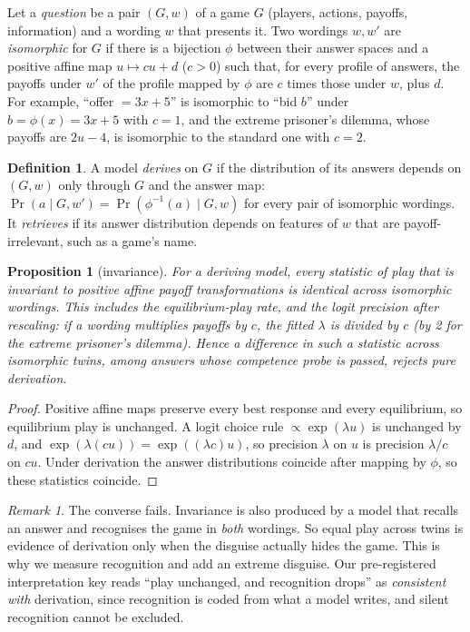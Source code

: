 \documentclass[11pt]{article}
\newtheorem{proposition}{Proposition}
\theoremstyle{definition}
\newtheorem{definition}{Definition}
\theoremstyle{remark}
\newtheorem*{remark}{Remark}
\newcommand{\lam}{\lambda}
\begin{document}
Let a \emph{question} be a pair $(G, w)$ of a game $G$ (players, actions, payoffs, information)
and a wording $w$ that presents it. Two wordings $w, w'$ are \emph{isomorphic} for $G$ if there is
a bijection $\phi$ between their answer spaces and a positive affine map $u\mapsto cu+d$ ($c>0$)
such that, for every profile of answers, the payoffs under $w'$ of the profile mapped by $\phi$
are $c$ times those under $w$, plus $d$. For example, ``offer $=3x+5$'' is isomorphic to ``bid
$b$'' under $b = \phi(x) = 3x+5$ with $c=1$, and the extreme prisoner's dilemma, whose payoffs are
$2u-4$, is isomorphic to the standard one with $c=2$.

\begin{definition}
A model \emph{derives} on $G$ if the distribution of its answers depends on $(G,w)$ only through
$G$ and the answer map: $\Pr(a \mid G, w') = \Pr(\phi^{-1}(a) \mid G, w)$ for every pair of
isomorphic wordings. It \emph{retrieves} if its answer distribution depends on features of $w$
that are payoff-irrelevant, such as a game's name.
\end{definition}

\begin{proposition}[invariance]\label{prop:invariance}
For a deriving model, every statistic of play that is invariant to positive affine payoff
transformations is identical across isomorphic wordings. This includes the equilibrium-play
rate, and the logit precision after rescaling: if a wording multiplies payoffs by $c$, the
fitted $\lam$ is divided by $c$ (by 2 for the extreme prisoner's dilemma). Hence a difference in
such a statistic across isomorphic twins, among answers whose competence probe is passed, rejects
pure derivation.
\end{proposition}
\begin{proof}
Positive affine maps preserve every best response and every equilibrium, so equilibrium play is
unchanged. A logit choice rule $\propto\exp(\lam u)$ is unchanged by $d$, and $\exp(\lam(cu))=
\exp((\lam c)u)$, so precision $\lam$ on $u$ is precision $\lam/c$ on $cu$. Under derivation the
answer distributions coincide after mapping by $\phi$, so these statistics coincide.
\end{proof}

\begin{remark}
The converse fails. Invariance is also produced by a model that recalls an answer and
recognises the game in \emph{both} wordings. So equal play across twins is evidence of
derivation only when the disguise actually hides the game. This is why we measure recognition
and add an extreme disguise. Our pre-registered interpretation key reads ``play unchanged, and
recognition drops'' as \emph{consistent with} derivation, since recognition is coded from what a
model writes, and silent recognition cannot be excluded.
\end{remark}
\end{document}
